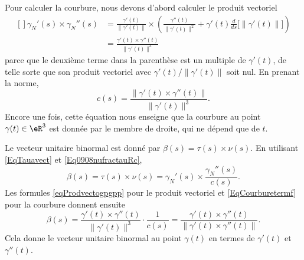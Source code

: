 Pour calculer la courbure, nous devons d'abord calculer le produit vectoriel
\begin{equation}        \label{eqProdvectogpgpp}
	\begin{aligned}[]
		\gamma_N'(s)\times \gamma_N''(s) & =  \frac{ \gamma'(t) }{ \| \gamma'(t) \| }\times \left( \frac{ \gamma''(t) }{ \| \gamma'(t) \|^2 }+\gamma'(t)\frac{ d }{ ds }\Big[ \| \gamma'(t) \| \Big] \right) \\
		                                 & =\frac{ \gamma'(t)\times \gamma''(t) }{ \| \gamma'(t) \|^3 }
	\end{aligned}
\end{equation}
parce que le deuxième terme dans la parenthèse est un multiple de \( \gamma'(t)\), de telle sorte que son produit vectoriel avec \( \gamma'(t)/\| \gamma'(t) \|\) soit nul. En prenant la norme,
\begin{equation}        \label{EqCourburetermf}
	c(s)=\frac{ \| \gamma'(t)\times \gamma''(t) \| }{ \| \gamma'(t) \|^3 }.
\end{equation}
Encore une fois, cette équation nous enseigne que la courbure au point \( \gamma(t)\in\eR^3\) est donnée par le membre de droite, qui ne dépend que de \( t\).

Le vecteur unitaire binormal est donné par \( \beta(s)=\tau(s)\times \nu(s)\). En utilisant \eqref{EqTauavect} et \eqref{Eq0908nufractauRc},
\begin{equation}
	\beta(s)=\tau(s)\times\nu(s)=\gamma_N'(s)\times \frac{ \gamma_N''(s) }{ c(s) }.
\end{equation}
Les formules \eqref{eqProdvectogpgpp} pour le produit vectoriel et \eqref{EqCourburetermf} pour la courbure donnent ensuite
\begin{equation}
	\beta(s)=\frac{ \gamma'(t)\times \gamma''(t) }{ \| \gamma'(t) \|^3 }\cdot\frac{1}{ c(s) }=\frac{ \gamma'(t)\times \gamma''(t) }{ \|  \gamma'(t)\times \gamma''(t)  \| }.
\end{equation}
Cela donne le vecteur unitaire binormal au point \( \gamma(t)\) en termes de \( \gamma'(t)\) et \( \gamma''(t)\).

